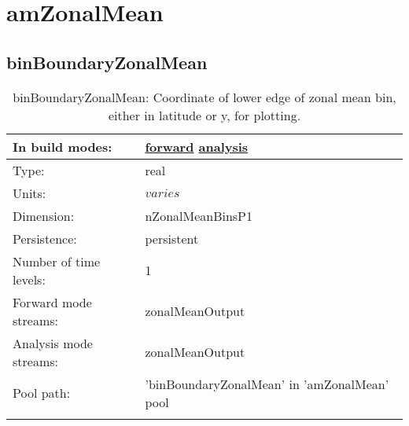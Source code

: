 \section[amZonalMean]{amZonalMean}
\label{sec:var_sec_amZonalMean}
\subsection[binBoundaryZonalMean]{binBoundaryZonalMean}
\label{subsec:var_sec_amZonalMean_binBoundaryZonalMean}
\begin{center}
\begin{longtable}{| p{2.0in} | p{4.0in} |}
        \hline 
        In build modes: & \hyperref[subsec:forward_var_tab_amZonalMean]{forward} \hyperref[subsec:analysis_var_tab_amZonalMean]{analysis} \\
        \hline 
        Type: & real \\
        \hline 
        Units: & $varies$ \\
        \hline 
        Dimension: & nZonalMeanBinsP1 \\
        \hline 
        Persistence: & persistent \\
        \hline 
        Number of time levels: & 1 \\
        \hline 
		 Forward mode streams: &  zonalMeanOutput \\
        \hline 
		 Analysis mode streams: &  zonalMeanOutput \\
        \hline 
            Pool path: & 'binBoundaryZonalMean' in 'amZonalMean' pool
 \\
		 \hline 
    \caption{binBoundaryZonalMean: Coordinate of lower edge of zonal mean bin, either in latitude or y, for plotting.}
\end{longtable}
\end{center}
